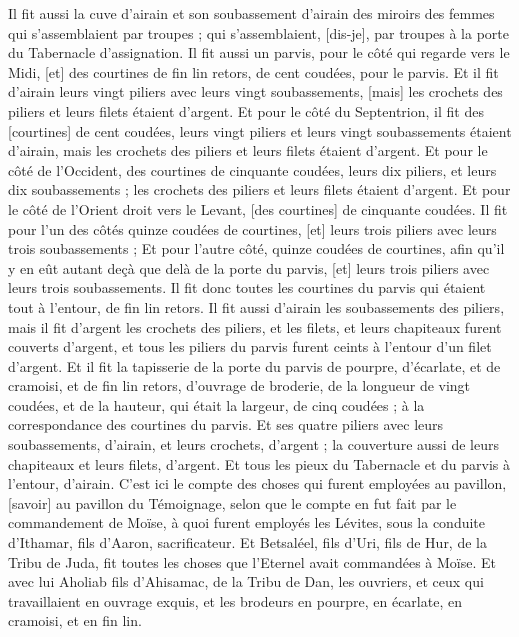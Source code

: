 \begin{multicols}{2}
Il fit aussi la cuve d'airain et son soubassement d'airain des miroirs des femmes qui s'assemblaient par troupes ; qui s'assemblaient, [dis-je], par troupes à la porte du Tabernacle d'assignation.
Il fit aussi un parvis, pour le côté qui regarde vers le Midi, [et] des courtines de fin lin retors, de cent coudées, pour le parvis.
Et il fit d'airain leurs vingt piliers avec leurs vingt soubassements, [mais] les crochets des piliers et leurs filets étaient d'argent.
Et pour le côté du Septentrion, il fit des [courtines] de cent coudées, leurs vingt piliers et leurs vingt soubassements étaient d'airain, mais les crochets des piliers et leurs filets étaient d'argent.
Et pour le côté de l'Occident, des courtines de cinquante coudées, leurs dix piliers, et leurs dix soubassements ; les crochets des piliers et leurs filets étaient d'argent.
Et pour le côté de l'Orient droit vers le Levant, [des courtines] de cinquante coudées.
Il fit pour l'un des côtés quinze coudées de courtines, [et] leurs trois piliers avec leurs trois soubassements ;
Et pour l'autre côté, quinze coudées de courtines, afin qu'il y en eût autant deçà que delà de la porte du parvis, [et] leurs trois piliers avec leurs trois soubassements.
Il fit donc toutes les courtines du parvis qui étaient tout à l’entour, de fin lin retors.
Il fit aussi d'airain les soubassements des piliers, mais il fit d'argent les crochets des piliers, et les filets, et leurs chapiteaux furent couverts d'argent, et tous les piliers du parvis furent ceints à l’entour d'un filet d'argent.
Et il fit la tapisserie de la porte du parvis de pourpre, d'écarlate, et de cramoisi, et de fin lin retors, d'ouvrage de broderie, de la longueur de vingt coudées, et de la hauteur, qui était la largeur, de cinq coudées ; à la correspondance des courtines du parvis.
Et ses quatre piliers avec leurs soubassements, d'airain, et leurs crochets, d'argent ; la couverture aussi de leurs chapiteaux et leurs filets, d'argent.
Et tous les pieux du Tabernacle et du parvis à l’entour, d'airain.
C'est ici le compte des choses qui furent employées au pavillon, [savoir] au pavillon du Témoignage, selon que le compte en fut fait par le commandement de Moïse, à quoi furent employés les Lévites, sous la conduite d'Ithamar, fils d'Aaron, sacrificateur.
Et Betsaléel, fils d'Uri, fils de Hur, de la Tribu de Juda, fit toutes les choses que l'Eternel avait commandées à Moïse.
Et avec lui Aholiab fils d'Ahisamac, de la Tribu de Dan, les ouvriers, et ceux qui travaillaient en ouvrage exquis, et les brodeurs en pourpre, en écarlate, en cramoisi, et en fin lin.

\end{multicols}
